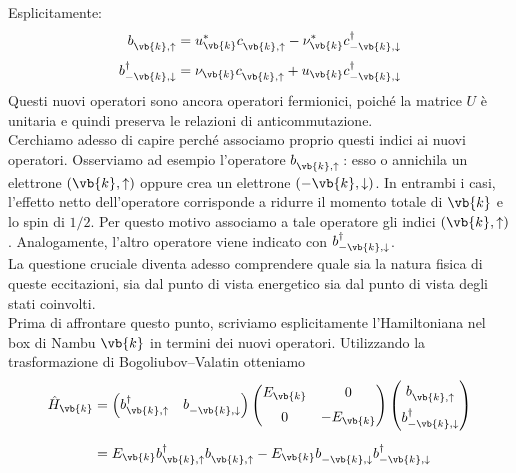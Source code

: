 Esplicitamente:
\begin{equation}
   \begin{split}
      b^{\vphantom{\dag}}_{\vb{k},\uparrow}
      &=
      u^*_{\vb{k}}
      c^{\vphantom{\dag}}_{\vb{k},\uparrow}
      -
      \nu^*_{\vb{k}}
      c^{\dag}_{-\vb{k},\downarrow}
      \\[0.1cm]
      b^{\dag}_{-\vb{k},\downarrow}
      &=
      \nu_{\vb{k}}
      c^{\vphantom{\dag}}_{\vb{k},\uparrow}
      +
      u_{\vb{k}}
      c^{\dag}_{-\vb{k},\downarrow}
   \end{split}
   \label{eq:Bogoliubov_Valatin_transformation_explicit}
\end{equation}
Questi nuovi operatori sono ancora operatori fermionici, poiché la matrice $U$ è unitaria e quindi preserva le relazioni di anticommutazione.\\
Cerchiamo adesso di capire perché associamo proprio questi indici ai nuovi operatori. Osserviamo ad esempio l'operatore $b^{\vphantom{\dag}}_{\vb{k},\uparrow}$\,: esso o annichila un elettrone $(\vb{k},\uparrow)$ oppure crea un elettrone $(-\vb{k},\downarrow)$. In entrambi i casi, l'effetto netto dell'operatore corrisponde a ridurre il momento totale di $\vb{k}$ e lo spin di $1/2$. Per questo motivo associamo a tale operatore gli indici $(\vb{k},\uparrow)$. Analogamente, l'altro operatore viene indicato con $b^{\dag}_{-\vb{k},\downarrow}$.\\
La questione cruciale diventa adesso comprendere quale sia la natura fisica di queste eccitazioni, sia dal punto di vista energetico sia dal punto di vista degli stati coinvolti.\\
Prima di affrontare questo punto, scriviamo esplicitamente l'Hamiltoniana nel box di Nambu $\vb{k}$ in termini dei nuovi operatori. Utilizzando la trasformazione di Bogoliubov--Valatin otteniamo
\begin{equation*}
   \begin{split}
      \hat{H}_{\vb{k}}
      &=
      \begin{pmatrix}
         b^{\dag}_{\vb{k},\uparrow}
         &
         b^{\vphantom{\dag}}_{-\vb{k},\downarrow}
      \end{pmatrix}
      \begin{pmatrix}
         E_{\vb{k}} & 0\\[0.2cm]
         0 & -E_{\vb{k}}
      \end{pmatrix}
      \begin{pmatrix}
         b^{\vphantom{\dag}}_{\vb{k},\uparrow}\\[0.2cm]
         b^{\dag}_{-\vb{k},\downarrow}
      \end{pmatrix}
      \\[0.2cm]
      &=
      E_{\vb{k}}
      b^{\dag}_{\vb{k},\uparrow}
      b^{\vphantom{\dag}}_{\vb{k},\uparrow}
      -
      E_{\vb{k}}
      b^{\vphantom{\dag}}_{-\vb{k},\downarrow}
      b^{\dag}_{-\vb{k},\downarrow}
   \end{split}
\end{equation*}
